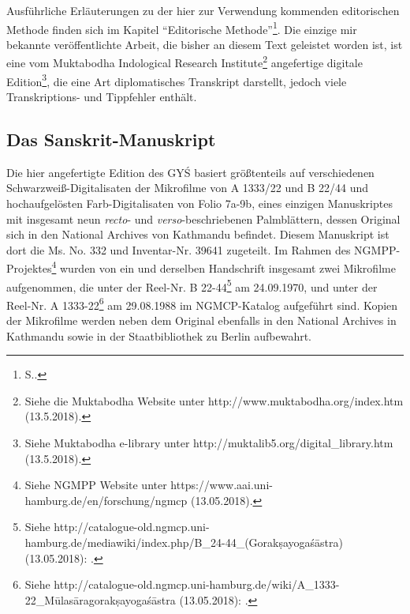 \documentclass[a4paper,12pt]{article}
\begin{document}
Ausführliche Erläuterungen zu der hier zur Verwendung kommenden editorischen Methode finden sich im Kapitel ``Editorische Methode''\footnote{S.\pageref{edmeth}.}. Die einzige mir bekannte veröffentlichte Arbeit, die bisher an diesem Text geleistet worden ist, ist eine vom Muktabodha Indological Research Institute\footnote{Siehe die Muktabodha Website unter http://www.muktabodha.org/index.htm (13.5.2018).} angefertige digitale Edition\footnote{Siehe Muktabodha e-library unter http://muktalib5.org/digital\_library.htm (13.5.2018).}, die eine Art diplomatisches Transkript darstellt, jedoch viele Transkriptions- und Tippfehler enthält. 

\subsection{Das Sanskrit-Manuskript}

Die hier angefertigte Edition des GYŚ basiert größtenteils auf verschiedenen Schwarzweiß-Digitalisaten der Mikrofilme von A 1333/22 und B 22/44 und hochaufgelösten Farb-Digitalisaten von Folio 7a-9b, eines einzigen Manuskriptes mit insgesamt neun \textit{recto}- und \textit{verso}-beschriebenen Palmblättern, dessen Original sich in den National Archives von Kathmandu befindet. Diesem Manuskript ist dort die Ms. No. 332 und Inventar-Nr. 39641 zugeteilt. Im Rahmen des NGMPP-Projektes\footnote{Siehe NGMPP Website unter https://www.aai.uni-hamburg.de/en/forschung/ngmcp (13.05.2018).} wurden von ein und derselben Handschrift insgesamt zwei Mikrofilme aufgenommen, die unter der Reel-Nr. B 22-44\footnote{\raggedright{Siehe http://catalogue-old.ngmcp.uni-hamburg.de/mediawiki/index.php/B\_24-44\_(Gorakṣayogaśāstra) (13.05.2018): \textcite{mscodex}.}} am 24.09.1970, und unter der Reel-Nr. A 1333-22\footnote{\raggedright{Siehe http://catalogue-old.ngmcp.uni-hamburg.de/wiki/A\_1333-22\_Mūlasāragorakṣayogaśāstra (13.05.2018): \textcite{mscodex2}.}} am 29.08.1988 im NGMCP-Katalog aufgeführt sind. Kopien der Mikrofilme werden neben dem Original ebenfalls in den National Archives in Kathmandu sowie in der Staatbibliothek zu Berlin aufbewahrt. 
\end{document}
